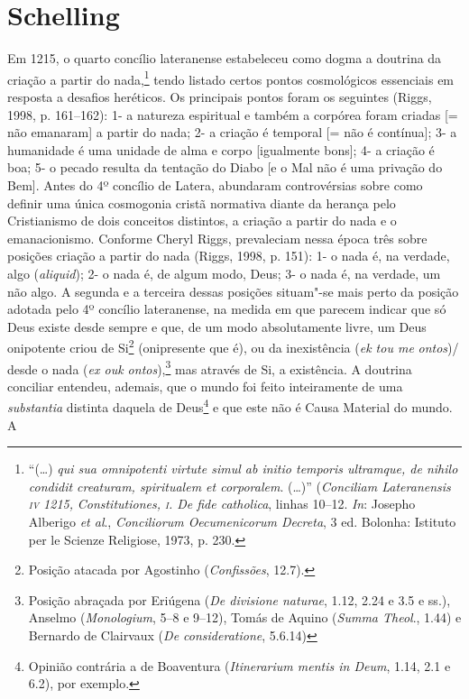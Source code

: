 \section{Schelling}

Em 1215, o quarto concílio lateranense estabeleceu como dogma
a doutrina da criação a partir do nada,\footnote{ “(\ldots{})
\emph{qui sua omnipotenti virtute simul ab initio temporis
ultramque, de nihilo condidit creaturam, spiritualem et
corporalem}. (\ldots{})” (\emph{Conciliam Lateranensis \textsc{iv} 1215,}
\emph{Constitutiones, \textsc{i}. De fide catholica}, linhas
10--12. \emph{In}: Josepho Alberigo \emph{et al}.,
\textit{Conciliorum Oecumenicorum Decreta}, 3 ed. Bolonha:
Istituto per le Scienze Religiose, 1973, p. 230.} tendo listado
certos pontos cosmológicos essenciais em resposta a desafios
heréticos. Os principais pontos foram os seguintes (Riggs, 1998,
p. 161--162): 1- a natureza espiritual e também a corpórea foram
criadas [= não emanaram] a partir do nada; 2- a criação é
temporal [= não é contínua]; 3- a humanidade é uma unidade de
alma e corpo [igualmente bons]; 4- a criação é boa; 5- o pecado
resulta da tentação do Diabo [e o Mal não é uma privação do
Bem]. Antes do 4º concílio de Latera, abundaram controvérsias
sobre como definir uma única cosmogonia cristã normativa diante
da herança pelo Cristianismo de dois conceitos distintos, a
criação a partir do nada e o emanacionismo. Conforme Cheryl
Riggs, prevaleciam nessa época três sobre posições criação a
partir do nada (Riggs, 1998, p. 151): 1- o nada é, na verdade,
algo (\emph{aliquid}); 2- o nada é, de algum modo, Deus; 3- o
nada é, na verdade, um não algo. A segunda e a terceira dessas
posições situam"-se mais perto da posição adotada pelo 4º
concílio lateranense, na medida em que parecem indicar que só
Deus existe desde sempre e que, de um modo absolutamente livre,
um Deus onipotente criou de Si\footnote{ Posição atacada por
Agostinho (\emph{Confissões}, 12.7).} (onipresente que é), ou
da inexistência (\emph{e}\emph{k tou m}\emph{e}\emph{
ontos})/\,desde o nada (\emph{e}\emph{x ouk ontos}),\footnote{
Posição abraçada por Eriúgena (\emph{De divisione naturae},
1.12, 2.24 e 3.5 e ss.), Anselmo (\emph{Monologium}, 5--8 e
9--12), Tomás de Aquino (\emph{Summa Theol}., 1.44) e Bernardo
de Clairvaux (\emph{De consideratione}, 5.6.14)} mas através
de Si, a existência. A doutrina conciliar entendeu, ademais, que
o mundo foi feito inteiramente de uma \emph{substantia}
distinta daquela de Deus\footnote{ Opinião contrária a de
Boaventura (\emph{Itinerarium mentis in Deum}, 1.14, 2.1 e
6.2), por exemplo.} e que este não é Causa Material do mundo. A
